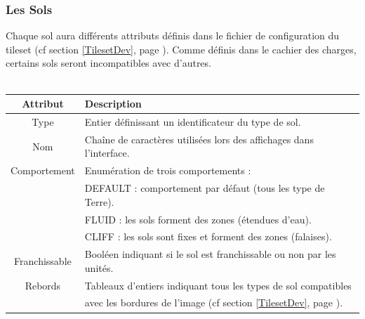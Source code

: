 \documentclass[a4paper]{article}
\newcommand{\alinea}{\hspace*{0.5cm}}
\begin{document}
        \subsubsection{Les Sols}
          \alinea Chaque sol aura différents attributs définis dans le fichier de configuration du tileset (cf section \ref{TilesetDev}, page \pageref{TilesetDev}). Comme définis dans le cachier des charges, certains sols seront incompatibles avec d'autres.\\
          \\
	  	  \begin{small}
			\begin{tabular}{| c | l |}
			  \hline
			  \textbf{Attribut} & \textbf{Description}\\
			  \hline
			  Type & Entier définissant un identificateur du type de sol.\\
			  \hline
			  Nom & Chaîne de caractères utilisées lors des affichages dans l'interface.\\
			  \hline
			  Comportement & Enumération de trois comportements :\\
			  & DEFAULT : comportement par défaut (tous les type de Terre).\\
			  & FLUID : les sols forment des zones (étendues d'eau).\\
			  & CLIFF : les sols sont fixes et forment des zones (falaises).\\
			  \hline
			  Franchissable & Booléen indiquant si le sol est franchissable ou non par les unités.\\
			  \hline
			  Rebords & Tableaux d'entiers indiquant tous les types de sol compatibles\\
			  & avec les bordures de l'image (cf  section \ref{TilesetDev}, page \pageref{TilesetDev}).\\
			  \hline
			\end{tabular}
		  \end{small}
          
\end{document}

